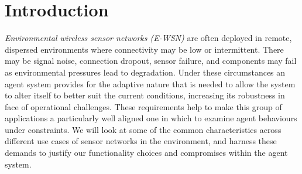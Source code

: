 \section{Introduction}

\textit{Environmental wireless sensor networks (E-WSN)} are often deployed in remote, dispersed environments where connectivity may be low or intermittent. There may be signal noise, connection dropout, sensor failure, and components may fail as environmental pressures lead to degradation. Under these circumstances an agent system provides for the adaptive nature that is needed to allow the system to alter itself to better suit the current conditions, increasing its robustness in face of operational challenges. These requirements help to make this group of applications a particularly well aligned one in which to examine agent behaviours under constraints. We will look at some of the common characteristics across different use cases of sensor networks in the environment, and harness these demands to justify our functionality choices and compromises within the agent system. 






